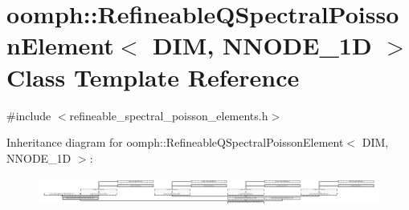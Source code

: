 \hypertarget{classoomph_1_1RefineableQSpectralPoissonElement}{}\section{oomph\+:\+:Refineable\+Q\+Spectral\+Poisson\+Element$<$ D\+IM, N\+N\+O\+D\+E\+\_\+1D $>$ Class Template Reference}
\label{classoomph_1_1RefineableQSpectralPoissonElement}


{\ttfamily \#include $<$refineable\+\_\+spectral\+\_\+poisson\+\_\+elements.\+h$>$}

Inheritance diagram for oomph\+:\+:Refineable\+Q\+Spectral\+Poisson\+Element$<$ D\+IM, N\+N\+O\+D\+E\+\_\+1D $>$\+:\begin{figure}[H]
\begin{center}
\leavevmode
\includegraphics[height=0.952381cm]{classoomph_1_1RefineableQSpectralPoissonElement}
\end{center}
\end{figure}
